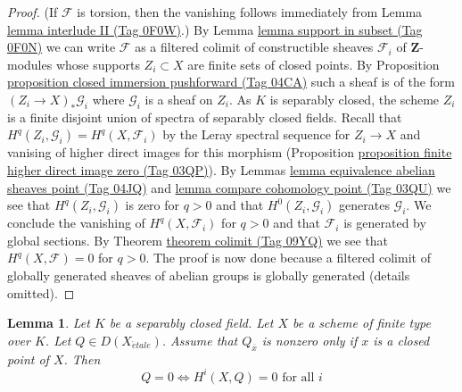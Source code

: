 \documentclass{amsart}
\theoremstyle{plain}
\newtheorem{lemma}[subsection]{Lemma}
\theoremstyle{definition}
\theoremstyle{remark}
\numberwithin{equation}{subsection}
\def\etale{{\acute{e}tale}}
\begin{document}
\begin{proof}
(If $\mathcal{F}$ is torsion, then the vanishing follows immediately
from Lemma \href{https://stacks.math.columbia.edu/tag/0F0W}{lemma interlude II (Tag 0F0W)}.)
By Lemma \href{https://stacks.math.columbia.edu/tag/0F0N}{lemma support in subset (Tag 0F0N)} we can write $\mathcal{F}$
as a filtered colimit of constructible sheaves $\mathcal{F}_i$
of $\mathbf{Z}$-modules whose supports $Z_i \subset X$ are finite
sets of closed points. By
Proposition \href{https://stacks.math.columbia.edu/tag/04CA}{proposition closed immersion pushforward (Tag 04CA)}
such a sheaf is of the form $(Z_i \to X)_*\mathcal{G}_i$
where $\mathcal{G}_i$ is a sheaf on $Z_i$. As $K$ is separably closed,
the scheme $Z_i$ is a finite disjoint union of spectra of separably closed
fields. Recall that $H^q(Z_i, \mathcal{G}_i) = H^q(X, \mathcal{F}_i)$
by the Leray spectral sequence for $Z_i \to X$ and vanising of higher
direct images for this morphism
(Proposition \href{https://stacks.math.columbia.edu/tag/03QP}{proposition finite higher direct image zero (Tag 03QP)}).
By Lemmas \href{https://stacks.math.columbia.edu/tag/04JQ}{lemma equivalence abelian sheaves point (Tag 04JQ)} and
\href{https://stacks.math.columbia.edu/tag/03QU}{lemma compare cohomology point (Tag 03QU)}
we see that $H^q(Z_i, \mathcal{G}_i)$ is zero for $q > 0$
and that $H^0(Z_i, \mathcal{G}_i)$ generates $\mathcal{G}_i$.
We conclude the vanishing of $H^q(X, \mathcal{F}_i)$ for $q > 0$
and that $\mathcal{F}_i$ is generated by global sections.
By Theorem \href{https://stacks.math.columbia.edu/tag/09YQ}{theorem colimit (Tag 09YQ)} we see that
$H^q(X, \mathcal{F}) = 0$ for $q > 0$.
The proof is now done because a
filtered colimit of globally generated sheaves of abelian groups
is globally generated (details omitted).
\end{proof}


\begin{lemma}
\label{lemma-vanishing-closed-points}
Let $K$ be a separably closed field. Let $X$ be a scheme of finite
type over $K$. Let $Q \in D(X_\etale)$. Assume that $Q_{\overline{x}}$
is nonzero only if $x$ is a closed point of $X$. Then
$$
Q = 0 \Leftrightarrow H^i(X, Q) = 0 \text{ for all }i
$$
\end{lemma}
\end{document}
